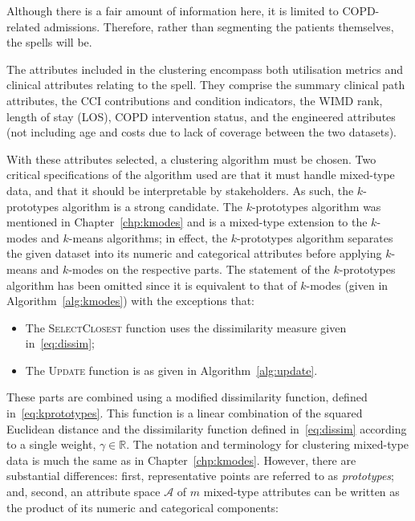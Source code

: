 Although there is a fair amount of information here, it is limited to
COPD-related admissions. Therefore, rather than segmenting the patients
themselves, the spells will be. 

The attributes included in the clustering encompass both utilisation metrics and
clinical attributes relating to the spell. They comprise the summary clinical
path attributes, the CCI contributions and condition indicators, the WIMD rank,
length of stay (LOS), COPD intervention status, and the engineered attributes
(not including age and costs due to lack of coverage between the two datasets).

With these attributes selected, a clustering algorithm must be chosen. Two
critical specifications of the algorithm used are that it must handle mixed-type
data, and that it should be interpretable by stakeholders. As such, the
\(k\)-prototypes algorithm is a strong candidate. The \(k\)-prototypes algorithm
was mentioned in Chapter~\ref{chp:kmodes} and is a mixed-type extension to the
\(k\)-modes and \(k\)-means algorithms; in effect, the \(k\)-prototypes
algorithm separates the given dataset into its numeric and categorical
attributes before applying \(k\)-means and \(k\)-modes on the respective parts.
The statement of the \(k\)-prototypes algorithm has been omitted since it is
equivalent to that of \(k\)-modes (given in Algorithm~\ref{alg:kmodes}) with the
exceptions that:

\begin{itemize}
    \item The \textsc{SelectClosest} function uses the dissimilarity measure
        given in~\eqref{eq:dissim};
    \item The \textsc{Update} function is as given in
        Algorithm~\ref{alg:update}.
\end{itemize}

These parts are combined using a modified dissimilarity function, defined
in~\eqref{eq:kprototypes}. This function is a linear combination of the squared
Euclidean distance and the dissimilarity function defined in~\eqref{eq:dissim}
according to a single weight, \(\gamma \in \mathbb R\). The notation and
terminology for clustering mixed-type data is much the same as in
Chapter~\ref{chp:kmodes}. However, there are substantial differences: first,
representative points are referred to as \emph{prototypes}; and, second, an
attribute space \(\mathcal A\) of \(m\) mixed-type attributes can be written as
the product of its numeric and categorical components:

